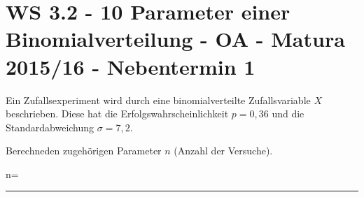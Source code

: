 \section{WS 3.2 - 10 Parameter einer Binomialverteilung - OA - Matura 2015/16 - Nebentermin 1}

\begin{beispiel}[WS 3.2]{1} %
Ein Zufallsexperiment wird durch eine binomialverteilte Zufallsvariable $X$ beschrieben. Diese hat
die Erfolgswahrscheinlichkeit $p = 0,36$ und die Standardabweichung $\sigma = 7,2$.\leer

Berechneden zugehörigen Parameter $n$ (Anzahl der Versuche).\leer

n=\rule{8cm}{0.3pt}


\end{beispiel}